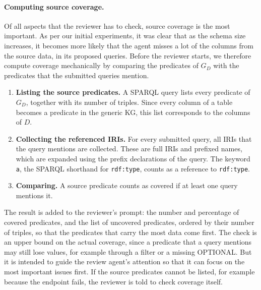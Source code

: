 \paragraph{Computing source coverage.}
Of all aspects that the reviewer has to check, source coverage is the most important. As per our initial experiments, it was clear that as the schema size increases, it becomes more likely that the agent misses a lot of the columns from the source data, in its proposed queries. Before the reviewer starts, we therefore compute coverage mechanically by comparing the predicates of \(G_D\) with the predicates that the submitted queries mention.
\begin{enumerate}[leftmargin=*, itemsep=3pt]
  \item \textbf{Listing the source predicates.} A SPARQL query lists every predicate of \(G_D\), together with its number of triples. Since every column of a table becomes a predicate in the generic KG, this list corresponds to the columns of \(D\).
  \item \textbf{Collecting the referenced IRIs.} For every submitted query, all IRIs that the query mentions are collected. These are full IRIs and prefixed names, which are expanded using the prefix declarations of the query. The keyword \texttt{a}, the SPARQL shorthand for \texttt{rdf:type}, counts as a reference to \texttt{rdf:type}.
  \item \textbf{Comparing.} A source predicate counts as covered if at least one query mentions it.
\end{enumerate}
The result is added to the reviewer's prompt: the number and percentage of covered predicates, and the list of uncovered predicates, ordered by their number of triples, so that the predicates that carry the most data come first. The check is an upper bound on the actual coverage, since a predicate that a query mentions may still lose values, for example through a filter or a missing OPTIONAL. But it is intended to guide the review agent's attention so that it can focus on the most important issues first. If the source predicates cannot be listed, for example because the endpoint fails, the reviewer is told to check coverage itself.

